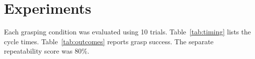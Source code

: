 \section{Experiments}
Each grasping condition was evaluated using 10 trials.
Table~\ref{tab:timing} lists the cycle times.
Table~\ref{tab:outcomes} reports grasp success.
The separate repeatability score was 80\%.
